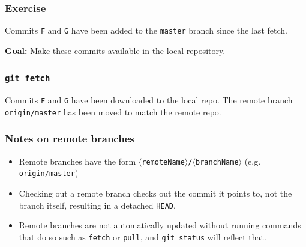 \documentclass{beamer}
\newcommand\gitcmd[1]{\texttt{git #1}}
\newcommand\gitsubcmd[1]{\texttt{#1}}
\newcommand\grefspec[1]{\texttt{#1}}
\newcommand\gbranch[1]{\texttt{#1}}
\newcommand\gremotebranch[1]{\texttt{#1}}
\newcommand\gHEAD{\texttt{HEAD}}
\newcommand\goal[1]{\textbf{Goal:} #1}
\begin{document}
\begin{frame}
  \frametitle{Exercise}

  Commits \grefspec{F} and \grefspec{G} have been added to the \gbranch{master} branch since the last fetch.

  \goal{Make these commits available in the local repository.}

  \begin{figure}
    \centering
  \end{figure}
\end{frame}

\begin{frame}
  \frametitle{\gitcmd{fetch}}

  \begin{figure}
    \centering
  \end{figure}

  Commits \grefspec{F} and \grefspec{G} have been downloaded to the local repo. The remote branch \gremotebranch{origin/master} has been moved to match the remote repo.
\end{frame}

\begin{frame}
  \frametitle{Notes on remote branches}
  \begin{itemize}
    \item Remote branches have the form \gremotebranch{$\langle$remoteName$\rangle$/$\langle$branchName$\rangle$} (e.g. \gremotebranch{origin/master})
    \item Checking out a remote branch checks out the commit it points to, not the branch itself, resulting in a detached \gHEAD{}.
    \item Remote branches are not automatically updated without running commands that do so such as \gitsubcmd{fetch} or \gitsubcmd{pull}, and \gitcmd{status} will reflect that.
  \end{itemize}
\end{frame}
\end{document}

